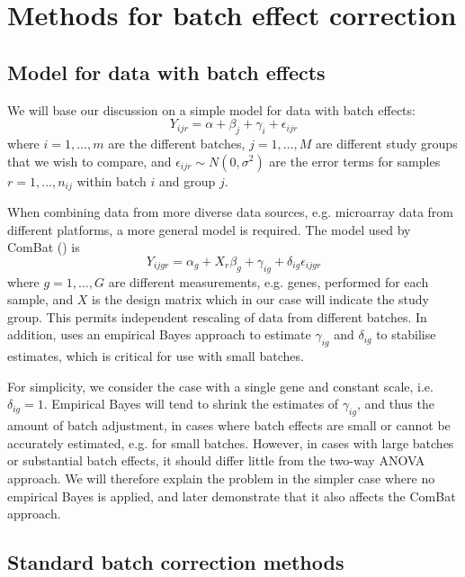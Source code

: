 \documentclass{bio}
\begin{document}
\section{Methods for batch effect correction}

\subsection{Model for data with batch effects}

We will base our discussion on a simple model for data with batch effects:
\begin{equation}\label{eq:model}
Y_{ijr}=\alpha+\beta_j+\gamma_i+\epsilon_{ijr}
\end{equation}
where $i=1,\ldots,m$ are the different batches, $j=1,\ldots,M$ are different study groups that we wish to compare, and $\epsilon_{ijr}\sim N(0,\sigma^2)$ are the error terms for samples $r=1,\ldots,n_{ij}$ within batch $i$ and group $j$.

When combining data from more diverse data sources, e.g. microarray data from different platforms, a more general model is required. The model used by ComBat (\citealp{Johnson2007}) is
\begin{equation}
Y_{ijgr}=\alpha_g+X_r\beta_{g}+\gamma_{ig}+\delta_{ig}\epsilon_{ijgr}
\end{equation}
where $g=1,\ldots,G$ are different measurements, e.g. genes, performed for each sample, and $X$ is the design matrix which in our case will indicate the study group. This permits independent rescaling of data from different batches. In addition, \citet{Johnson2007} uses an empirical Bayes approach to estimate $\gamma_{ig}$ and $\delta_{ig}$ to stabilise estimates, which is critical for use with small batches.

For simplicity, we consider the case with a single gene and constant scale, i.e. $\delta_{ig}=1$. Empirical Bayes will tend to shrink the estimates of  $\gamma_{ig}$, and thus the amount of batch adjustment, in cases where batch effects are small or cannot be accurately estimated, e.g. for small batches. However, in cases with large batches or substantial batch effects, it should differ little from the two-way ANOVA approach. We will therefore explain the problem in the simpler case where no empirical Bayes is applied, and later demonstrate that it also affects the ComBat approach.

\subsection{Standard batch correction methods}
\end{document}
